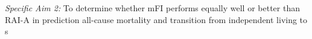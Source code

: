 \emph{Specific Aim 2:} To determine whether mFI performs equally well or better than RAI-A in prediction all-cause mortality and transition from independent living to s